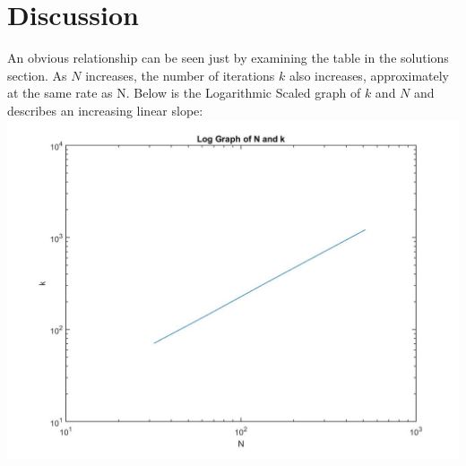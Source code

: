 \documentclass[12pt]{article}
\begin{document}
\section{Discussion}
An obvious relationship can be seen just by examining the table in the solutions section. As $N$ increases, the number of iterations $k$ also increases, approximately at the same rate as N. Below is the Logarithmic Scaled graph of $k$ and $N$ and describes an increasing linear slope: \\
\includegraphics[scale = 0.45]{logplotN-k.jpg}
 
\end{document}
